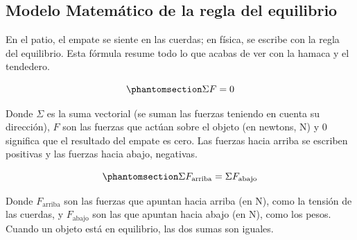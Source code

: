 \documentclass[
  spanish,
  letterpaper,
  12pt,
  oneside,
  open=any,
  DIV=15]{scrbook}
\begin{document}
\subsection{Modelo Matemático de la regla del
equilibrio}\label{modelo-matemuxe1tico-de-la-regla-del-equilibrio}

En el patio, el empate se siente en las cuerdas; en física, se escribe
con la regla del equilibrio. Esta fórmula resume todo lo que acabas de
ver con la hamaca y el tendedero.

\begin{tcolorbox}[enhanced jigsaw, arc=.35mm, bottomrule=.15mm, bottomtitle=1mm, breakable, colback=white, colbacktitle=quarto-callout-important-color!10!white, colframe=quarto-callout-important-color-frame, coltitle=black, left=2mm, leftrule=.75mm, opacityback=0, opacitybacktitle=0.6, rightrule=.15mm, title=\textcolor{quarto-callout-important-color}{\faExclamation}\hspace{0.5em}{Ecuación 1: Regla del equilibrio}, titlerule=0mm, toprule=.15mm, toptitle=1mm]

\begin{equation}\protect\phantomsection\label{eq-regla-equilibrio}{
\Sigma F = 0
}\end{equation}

Donde \(\Sigma\) es la suma vectorial (se suman las fuerzas teniendo en
cuenta su dirección), \(F\) son las fuerzas que actúan sobre el objeto
(en newtons, \(\text{N}\)) y \(0\) significa que el resultado del empate
es cero. Las fuerzas hacia arriba se escriben positivas y las fuerzas
hacia abajo, negativas.

\end{tcolorbox}

\begin{tcolorbox}[enhanced jigsaw, arc=.35mm, bottomrule=.15mm, bottomtitle=1mm, breakable, colback=white, colbacktitle=quarto-callout-important-color!10!white, colframe=quarto-callout-important-color-frame, coltitle=black, left=2mm, leftrule=.75mm, opacityback=0, opacitybacktitle=0.6, rightrule=.15mm, title=\textcolor{quarto-callout-important-color}{\faExclamation}\hspace{0.5em}{Ecuación 2: Igualdad de los tirones}, titlerule=0mm, toprule=.15mm, toptitle=1mm]

\begin{equation}\protect\phantomsection\label{eq-igualdad-tirones}{
\Sigma F_{\text{arriba}} = \Sigma F_{\text{abajo}}
}\end{equation}

Donde \(F_{\text{arriba}}\) son las fuerzas que apuntan hacia arriba (en
\(\text{N}\)), como la tensión de las cuerdas, y \(F_{\text{abajo}}\)
son las que apuntan hacia abajo (en \(\text{N}\)), como los pesos.
Cuando un objeto está en equilibrio, las dos sumas son iguales.

\end{tcolorbox}
\end{document}
